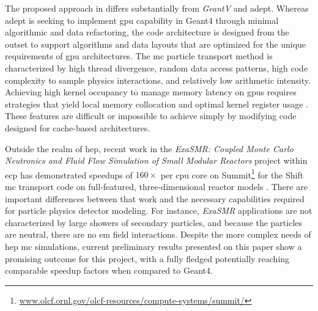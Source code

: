 The proposed approach in \celeritas differs substantially from \emph{GeantV} and
\acs{adept}. Whereas \acs{adept} is seeking to implement \ac{gpu} capability in
Geant4 through minimal algorithmic and data refactoring, the \celeritas code
architecture is designed from the outset to support algorithms and data layouts
that are optimized for the unique requirements of \ac{gpu} architectures. The
\ac{mc} particle transport method is characterized by high thread divergence,
random data access patterns, high code complexity to sample physics
interactions, and relatively low arithmetic intensity.  Achieving high kernel
occupancy to manage memory latency on \acp{gpu} requires strategies that yield
local memory collocation and optimal kernel register usage
\cite{hamilton_continuous-energy_2019}.  These features are difficult or
impossible to achieve simply by modifying code designed for cache-based
architectures.

Outside the realm of \ac{hep}, recent work in the \emph{ExaSMR: Coupled Monte
Carlo Neutronics and Fluid Flow Simulation of Small Modular Reactors} project
within \ac{ecp} has demonstrated speedups of $160\times$ per \ac{cpu} core on
Summit\footnote
{
    \href{https://www.olcf.ornl.gov/olcf-resources/compute-systems/summit/}
    {www.olcf.ornl.gov/olcf-resources/compute-systems/summit/}
}
for the Shift \ac{mc} transport code on full-featured, three-dimensional reactor
models \cite{hamilton_continuous-energy_2019}. There are important differences
between that work and the necessary capabilities required for particle physics
detector modeling. For instance, \emph{ExaSMR} applications are not
characterized by large showers of secondary particles, and because the particles
are neutral, there are no \ac{em} field interactions. Despite the more complex
needs of \ac{hep} \ac{mc} simulations, current preliminary results presented on
this paper show a promising outcome for this project, with a fully fledged
\celeritas potentially reaching comparable speedup factors when compared to
Geant4.
